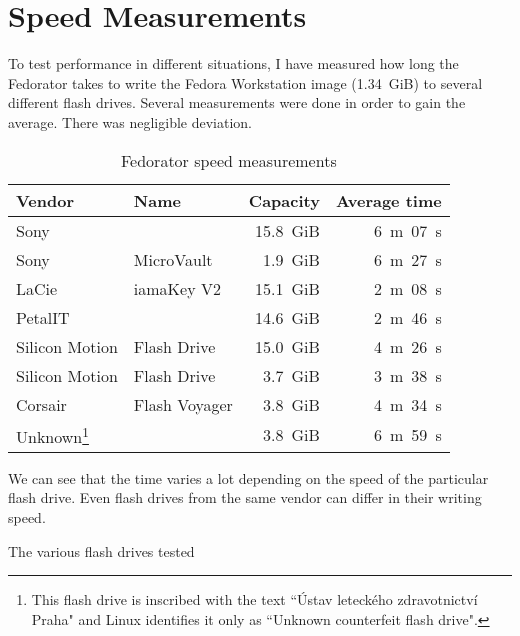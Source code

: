     \section{Speed Measurements}
        To test performance in different situations, I have measured how long the Fedorator takes to write the Fedora Workstation image (1.34~GiB) to several different flash drives.  Several measurements were done in order to gain the average.  There was negligible deviation.
        
        \begin{table}[htbp]
        \centering
        \caption{Fedorator speed measurements}
        \label{usb-duplicators}
            \begin{tabular}{ m{8em} m{8em} r r }
            \toprule
                \textbf{Vendor} & \textbf{Name} & \textbf{Capacity} & \textbf{Average time} \\
            \toprule
            
       Sony                         & & 15.8~GiB & 6~m~07~s \\
\hline Sony   & MicroVault            &  1.9~GiB & 6~m~27~s \\
\hline LaCie  & iamaKey V2            & 15.1~GiB & 2~m~08~s \\
\hline PetalIT                      & & 14.6~GiB & 2~m~46~s \\
\hline Silicon Motion & Flash Drive   & 15.0~GiB & 4~m~26~s \\
\hline Silicon Motion & Flash Drive   &  3.7~GiB & 3~m~38~s \\
\hline Corsair & Flash Voyager        &  3.8~GiB & 4~m~34~s \\
\hline Unknown\footnote{This flash drive is inscribed with the text ``Ústav leteckého zdravotnictví Praha" and Linux identifies it only as ``Unknown counterfeit flash drive".}
                                    & &  3.8~GiB & 6~m~59~s \\
\hline
            \end{tabular}
        \end{table}
        
        We can see that the time varies a lot depending on the speed of the particular flash drive.  Even flash drives from the same vendor can differ in their writing speed.
        
            {The various flash drives tested}
        
